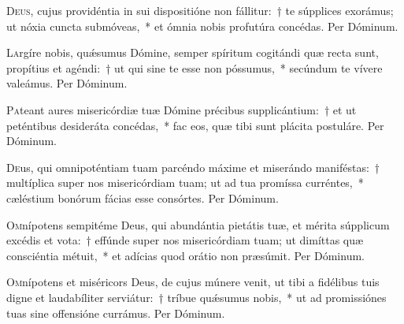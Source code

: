 \documentclass[vesperale_romanum.tex]{subfiles}
\begin{document}
\lettrine{D}{eus}, cujus providéntia in sui dispositióne non fállitur:~† te súpplices exorámus; ut nóxia cuncta submóveas,~* et ómnia nobis profutúra concédas.
Per Dóminum. 



\oratio

\lettrine{L}{a}rgíre nobis, quǽsumus Dómine, semper spíritum cogitándi quæ recta sunt, propítius et agéndi:~† ut qui sine te esse non póssumus,~* secúndum te vívere valeámus. Per Dóminum. 



\oratio

\lettrine{P}{a}teant aures misericórdiæ tuæ Dómine précibus supplicántium:~† et ut peténtibus desideráta concédas,~* fac eos, quæ tibi sunt plácita postuláre.
Per Dóminum.



\oratio

\lettrine{D}{e}us, qui omnipoténtiam tuam parcéndo máxime et miserándo maniféstas:~† multíplica super nos misericórdiam tuam; ut ad tua promíssa curréntes,~* cæléstium bonórum fácias esse consórtes. Per Dóminum.



\oratio

\lettrine{O}{m}nípotens sempitéme Deus, qui abundántia pietátis tuæ, et mérita súpplicum excédis et vota:~† effúnde super nos misericórdiam tuam; ut dimíttas quæ consciéntia métuit,~* et adícias quod orátio non præsúmit. Per Dóminum.



\oratio

\lettrine{O}{m}nípotens et miséricors Deus, de cujus múnere venit, ut tibi a fidélibus tuis digne et laudabíliter serviátur:~† tríbue quǽsumus nobis,~* ut ad promissiónes tuas sine offensióne currámus. Per Dóminum.
\end{document}
